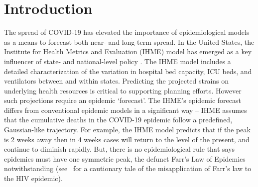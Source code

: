 \section{Introduction}
The spread of COVID-19 has elevated the importance of epidemiological
models as a means to forecast both near- and long-term spread. 
In the United States, the Institute for Health Metrics and Evaluation (IHME)
model has emerged as a key influencer of state- and national-level
policy \citep{covid2020forecasting}.  
The IHME model includes a detailed characterization
of the variation in
hospital bed capacity, ICU beds, and ventilators between and within
states. Predicting the projected strains on underlying
health resources is critical to supporting planning efforts.
However such projections require
an epidemic `forecast'.  The IHME's epidemic forecast
differs from conventional
epidemic models in a significant way -- IHME assumes
that the cumulative deaths in the COVID-19 epidemic
follow a predefined, Gaussian-like trajectory.
For example, the 
IHME model predicts that if the peak is 2 weeks away then in 4 weeks
cases will return to the level of the present, and continue
to diminish rapidly.  But, there is no epidemiological rule
that says epidemics must have one symmetric peak, 
the defunct Farr's Law of Epidemics notwithstanding
(see~\citep{bregman1990farr} for a cautionary tale of the 
misapplication of Farr's law to the HIV epidemic). 

